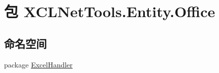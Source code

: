 \hypertarget{namespace_x_c_l_net_tools_1_1_entity_1_1_office}{\section{包 X\-C\-L\-Net\-Tools.\-Entity.\-Office}
\label{namespace_x_c_l_net_tools_1_1_entity_1_1_office}
}
\subsection*{命名空间}
\begin{DoxyCompactItemize}
\item 
package \hyperlink{namespace_x_c_l_net_tools_1_1_entity_1_1_office_1_1_excel_handler}{Excel\-Handler}
\end{DoxyCompactItemize}
